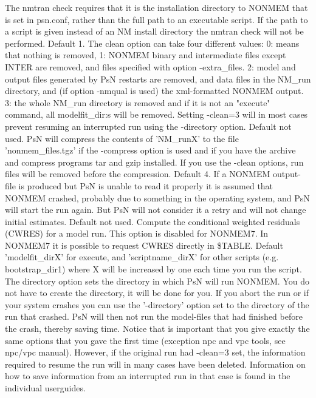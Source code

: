 \begin{optionlist}
The nmtran check requires that it is the installation directory to NONMEM that is set in psn.conf, rather than the full path to an executable script. If the path to a script is given instead of an NM install directory the nmtran check will not be performed.
\nextopt
{}
Default 1. The clean option can take four different values:  0: means that nothing is removed, 1: NONMEM binary and intermediate files except INTER are removed, and files specified with option -extra\_files. 2: model and output files generated by PsN restarts are removed, and data files in the NM\_run directory, and (if option -nmqual is used) the xml-formatted NONMEM output. 3: the whole NM\_run directory is removed and if it is not an "execute" command, all modelfit\_dir:s will be removed. Setting -clean=3 will in most cases prevent resuming an interrupted run using the -directory option.
\nextopt
{}
Default not used. PsN will compress the contents of 'NM\_runX' to the file 'nonmem\_files.tgz' if the -compress option is used and if you have the archive and compress programs tar and gzip installed. If you use the -clean options, run files will be removed before the compression.  
\nextopt
{}
Default 4. If a NONMEM output-file is produced but PsN is unable to read it properly it is assumed that NONMEM crashed, probably due to something in the operating system, and PsN will start the run again. But PsN will not consider it a retry and will not change initial estimates. 
\nextopt
{}
Default not used. Compute the conditional weighted residuals (CWRES) for a model run. This option is disabled for NONMEM7. In NONMEM7 it is possible to request CWRES directly in \$TABLE. 
\nextopt
{}
Default 'modelfit\_dirX' for execute, and 'scriptname\_dirX' for other scripts (e.g. bootstrap\_dir1) where X will be increased by one each time you run the script. The directory option sets the directory in which PsN will run  NONMEM. You do not have to create the directory,  it will be done for you. If you abort the run or if your system crashes you can use the '-directory' option set to the directory of the run that crashed. PsN will then not run the model-files that had finished before the crash, thereby saving time. Notice that is important that you give exactly the same options that you gave the first time (exception npc and vpc tools, see npc/vpc manual). However, if the original run had -clean=3 set, the information required to resume the run will in many cases have been deleted. Information on how to save information from an interrupted run in that case is found in the individual userguides.

\end{optionlist}
